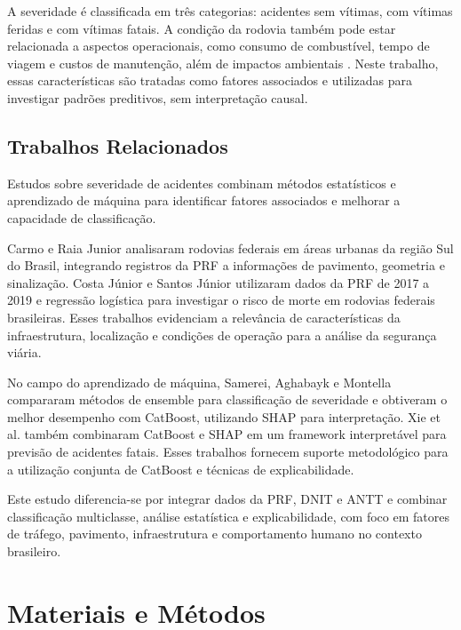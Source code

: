 \documentclass[12pt]{article}
\begin{document}
A severidade é classificada em três categorias: acidentes sem vítimas, com vítimas feridas e com vítimas fatais. A condição da rodovia também pode estar relacionada a aspectos operacionais, como consumo de combustível, tempo de viagem e custos de manutenção, além de impactos ambientais \cite{bartholomeu2008}. Neste trabalho, essas características são tratadas como fatores associados e utilizadas para investigar padrões preditivos, sem interpretação causal.

\subsection{Trabalhos Relacionados}
Estudos sobre severidade de acidentes combinam métodos estatísticos e aprendizado de máquina para identificar fatores associados e melhorar a capacidade de classificação.

Carmo e Raia Junior \cite{carmo2019} analisaram rodovias federais em áreas urbanas da região Sul do Brasil, integrando registros da PRF a informações de pavimento, geometria e sinalização. Costa Júnior e Santos Júnior \cite{costa2022} utilizaram dados da PRF de 2017 a 2019 e regressão logística para investigar o risco de morte em rodovias federais brasileiras. Esses trabalhos evidenciam a relevância de características da infraestrutura, localização e condições de operação para a análise da segurança viária.

No campo do aprendizado de máquina, Samerei, Aghabayk e Montella \cite{samerei2024} compararam métodos de ensemble para classificação de severidade e obtiveram o melhor desempenho com CatBoost, utilizando SHAP para interpretação. Xie et al. \cite{xie2025} também combinaram CatBoost e SHAP em um framework interpretável para previsão de acidentes fatais. Esses trabalhos fornecem suporte metodológico para a utilização conjunta de CatBoost e técnicas de explicabilidade.

Este estudo diferencia-se por integrar dados da PRF, DNIT e ANTT e combinar classificação multiclasse, análise estatística e explicabilidade, com foco em fatores de tráfego, pavimento, infraestrutura e comportamento humano no contexto brasileiro.

\section{Materiais e Métodos}
\end{document}
